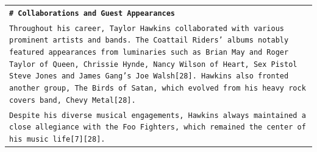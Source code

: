 \begin{longtable}{p{\textwidth}}
\vspace{1pt}
\texttt{\small{\textbf{\# Collaborations and Guest Appearances}}} \\
\texttt{\small{Throughout his career, Taylor Hawkins collaborated with various prominent artists and bands. The Coattail Riders' albums notably featured appearances from luminaries such as Brian May and Roger Taylor of Queen, Chrissie Hynde, Nancy Wilson of Heart, Sex Pistol Steve Jones and James Gang's Joe Walsh[28]. Hawkins also fronted another group, The Birds of Satan, which evolved from his heavy rock covers band, Chevy Metal[28].}} \\
\texttt{\small{Despite his diverse musical engagements, Hawkins always maintained a close allegiance with the Foo Fighters, which remained the center of his music life[7][28].}} \\


\end{longtable}
